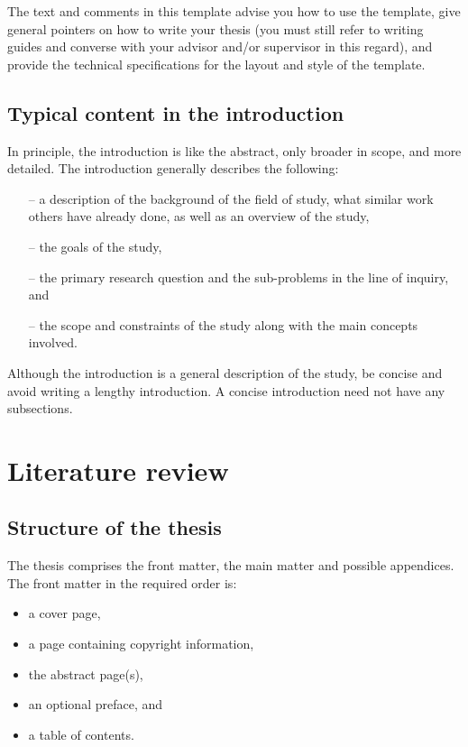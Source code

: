 \documentclass[english, 12pt, a4paper, biz, utf8, a-2b, online]{aaltothesis}
\begin{document}
The text and comments in this template advise you how to use the template, give 
general pointers on how to write your thesis (you must still refer to writing
guides and converse with your advisor and/or supervisor in this regard), and
provide the technical specifications for the layout and style of the template.

\subsection{Typical content in the introduction}

In principle, the introduction is like the abstract, only broader in scope, and
more detailed. The introduction generally describes the following:

\begin{itemize}
	\item[--] a description of the background of the field of study, what
	similar work others have already done, as well as an overview of the study,
	\item[--] the goals of the study,
	\item[--] the primary research question and the sub-problems in the line
	of inquiry, and
	\item[--] the scope and constraints of the study along with the main
	concepts involved.
\end{itemize}

Although the introduction is a general description of the study, be concise and 
avoid writing a lengthy introduction. A concise introduction need not have any 
subsections.

\clearpage

\section{Literature review}
\subsection{Structure of the thesis}

The thesis comprises the front matter, the main matter and possible appendices.
The front matter in the required order is:

\begin{itemize}
	\item a cover page,
	\item a page containing copyright information,
	\item the abstract page(s),
	\item an optional preface, and
	\item a table of contents.
\end{itemize}
\end{document}

